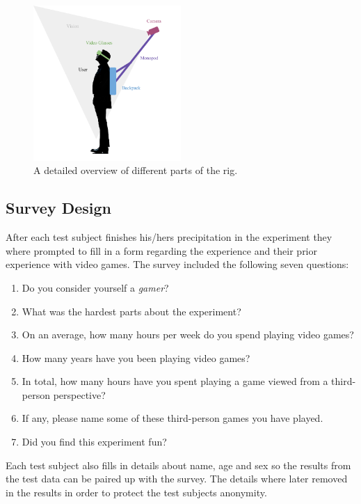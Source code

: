 \documentclass[runningheads,a4paper,oribibl]{llncs}
\begin{document}
\begin{figure}
   \centering
   \includegraphics[width=0.5\textwidth]{ExternalMaterial/Rig}
   \caption{A detailed overview of different parts of the rig. \label{fig:RigDesign}}
\end{figure}










\subsection{Survey Design}
After each test subject finishes his/hers precipitation in the experiment they where prompted to fill in a form regarding the experience and their prior experience with video games. The survey included the following seven questions:
\begin{enumerate}
	\item Do you consider yourself a \emph{gamer}?
	\item What was the hardest parts about the experiment?
	\item On an average, how many hours per week do you spend playing video games?
	\item How many years have you been playing video games?
	\item In total, how many hours have you spent playing a game viewed from a third-person perspective?
	\item If any, please name some of these third-person games you have played.
	\item Did you find this experiment fun?
\end{enumerate}
Each test subject also fills in details about name, age and sex so the results from the test data can be paired up with the survey. The details where later removed in the results in order to protect the test subjects anonymity.
\end{document}
